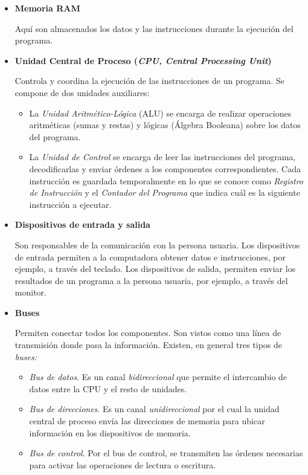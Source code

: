 \documentclass[11pt,spanish]{article}
\begin{document}
\begin{itemize}
\item \textbf{Memoria RAM}

Aquí son almacenados los datos y las instrucciones durante la ejecución
del programa.
\item \textbf{Unidad Central de Proceso (}\textbf{\emph{CPU, Central Processing
Unit}}\textbf{)}

Controla y coordina la ejecución de las instrucciones de un programa.
Se compone de dos unidades auxiliares: 
\begin{itemize}
\item La \emph{Unidad Aritmético-Lógica }(ALU) se encarga de realizar operaciones
aritméticas (sumas y restas) y lógicas (Álgebra Booleana) sobre los
datos del programa. 
\item La \emph{Unidad de Control} se encarga de leer las instrucciones del
programa, decodificarlas y enviar órdenes a los componentes correspondientes.
Cada instrucción es guardada temporalmente en lo que se conoce como
\emph{Registro de Instrucción} y el \emph{Contador del Programa} que
indica cuál es la siguiente instrucción a ejecutar.
\end{itemize}
\item \textbf{Dispositivos de entrada y salida}

Son responsables de la comunicación con la persona usuaria. Los dispositivos
de entrada permiten a la computadora obtener datos e instrucciones,
por ejemplo, a través del teclado. Los dispositivos de salida, permiten
enviar los resultados de un programa a la persona usuaria, por ejemplo, a través
del monitor.
\item \textbf{Buses}

Permiten conectar todos los componentes. Son vistos como una línea
de transmisión donde pasa la información. Existen, en general tres
tipos de \emph{buses:}
\begin{itemize}
\item \emph{Bus de datos}. Es un canal \emph{bidireccional }que\emph{ }permite
el intercambio de datos entre la CPU y el resto de unidades.
\item \emph{Bus de direcciones}. Es un canal \emph{unidireccional} por el
cual la unidad central de proceso envía las direcciones de memoria
para ubicar información en los dispositivos de memoria.
\item \emph{Bus de control}. Por el bus de control, se transmiten las órdenes
necesarias para activar las operaciones de lectura o escritura.
\end{itemize}
\end{itemize}
\end{document}
